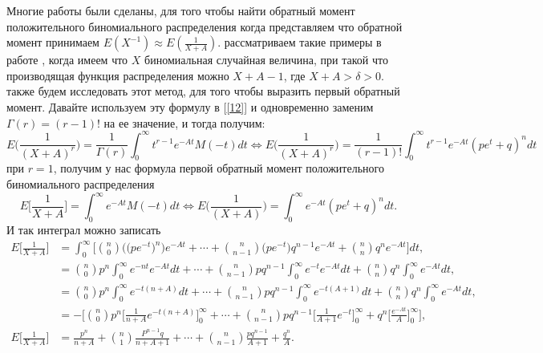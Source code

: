 \documentclass[13pt]{article}
\begin{document}
Многие работы были сделаны, для того чтобы найти обратный момент положительного биномиального распределения когда представляем что обратной момент принимаем  $E(X^{-1}) \approx E(\frac{1}{X+A})$. рассматриваем такие примеры в работе  \cite{chao1972negative}, когда имеем что  $X$ биномиальная случайная величина, при такой что производящая функция распределения можно $X+A-1$, где $X+A>\delta>0$. также будем исследовать  этот метод, для того чтобы выразить первый обратный момент.
Давайте используем эту формулу в [\ref{12}] и одновременно заменим $\Gamma(r)= (r-1)!$ на ее значение, и тогда получим:
\begin{equation*}
    E\Big(\frac{1}{(X+A)^{r}}\Big) = \frac{1}{\Gamma(r)}\int_{0}^{\infty}t^{r-1}e^{-At}M(-t)dt 
    \Longleftrightarrow
     E\Big(\frac{1}{(X+A)^{r}}\Big) = \frac{1}{(r-1)!}\int_{0}^{\infty}t^{r-1}e^{-At}(pe^{t}+ q)^{n}dt
\end{equation*}
при $r=1$, получим у нас формула первой обратный момент положительного биномиального распределения 
\begin{equation*}
   E\Big[\frac{1}{X+A}\Big] = \int_{0}^{\infty} e^{-At}M(-t)dt \Longleftrightarrow E\Big(\frac{1}{(X+A)}\Big) =  \int_{0}^{\infty}e^{-At}(pe^{t}+ q)^{n} dt.
\end{equation*}
И так интеграл можно записать 
\begin{align*}
  E\Big[\frac{1}{X+A}\Big] &=  \int_{0}^{\infty} \Bigg[\binom{n}{0}\Big(\big(pe^{-t}\big)^{n}\Big)e^{-At}  +\cdots 
    +\binom{n}{n-1}\big(pe^{-t}\big)q^{n-1} e^{-At} 
    +\binom{n}{n}q^{n} e^{-At}\Bigg]dt ,\\ 
    &=\binom{n}{0}p^{n} \int_{0}^{\infty}e^{-nt} e^{-At}dt + \cdots+ \binom{n}{n-1}pq^{n-1} \int_{0}^{\infty}e^{-t} e^{-At} dt + \binom{n}{n}q^{n} \int_{0}^{\infty} e^{-At}dt ,\\
    &=\binom{n}{0}p^{n} \int_{0}^{\infty}e^{-t(n+A)}dt + \cdots+ \binom{n}{n-1}pq^{n-1} \int_{0}^{\infty}e^{-t(A+1)} dt + \binom{n}{n}q^{n} \int_{0}^{\infty} e^{-At}dt ,\\
   &=-\Bigg[\binom{n}{0}p^{n}\Big[\frac{1}{n+A}e^{-t(n+A)}\Big]_{0}^{\infty}  + \cdots+\binom{n}{n-1}pq^{n-1}\Big[\frac{1}{A+1}e^{-t}\Big]_{0}^{\infty}+ q^{n}\Big[\frac{e^{-At}}{A}\Big]_{0}^{\infty} \Bigg] ,\\
 E\Big[\frac{1}{X+A}\Big]  &=  \frac{p^{n}}{n+A} + \binom{n}{1}\frac{P^{n-1}q}{n+A+1}+ \cdots +  \binom{n}{n-1}\frac{pq^{n-1}}{A+1}+ \frac{q^{n}}{A}.
\end{align*}
\end{document}
